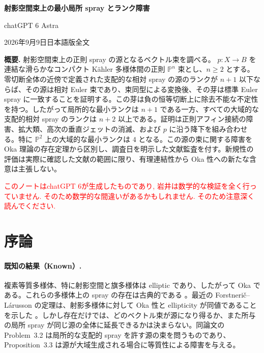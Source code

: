 \documentclass[12pt]{amsart}
\theoremstyle{definition}
\theoremstyle{remark}
\numberwithin{equation}{section}
\newcommand{\mP}{\mathbb{P}}
\newcommand{\xr}[1]{\textcolor{red}{#1}}
\begin{document}
\newpage
\setcounter{section}{0}
\setcounter{equation}{0}
\setcounter{thm}{0}
\renewcommand{\theHsection}{ja.\arabic{section}}
\renewcommand{\theHequation}{ja.\arabic{section}.\arabic{equation}}
\renewcommand{\theHthm}{ja.\arabic{section}.\arabic{thm}}
\renewcommand{\proofname}{証明}
\begin{center}
{\Large\bfseries 射影空間束上の最小局所 spray とランク障害\par}
\medskip
{\large chatGPT 6 Astra\par}
\medskip
2026年9月9日\quad 日本語版全文
\end{center}
\medskip
\noindent\textbf{概要.}
射影空間束上の正則 spray の源となるベクトル束を調べる。
$p:X\to B$ を連結な滑らかなコンパクト K\"ahler 多様体間の正則 $\mP^n$ 束とし、$n\geq2$ とする。
零切断全体の近傍で定義された支配的な相対 spray の源のランクが $n+1$ 以下ならば、その源は相対 Euler 束であり、束同型による変換後、その芽は標準 Euler spray に一致することを証明する。この芽は負の恒等切断上に除去不能な不定性を持つ。したがって局所的な最小ランクは $n+1$ である一方、すべての大域的な支配的相対 spray のランクは $n+2$ 以上である。証明は正則アフィン接続の障害、拡大類、高次の垂直ジェットの消滅、および $p$ に沿う降下を組み合わせる。特に $\mP^2$ 上の大域的な最小ランクは $4$ となる。この源の束に関する障害を Oka 理論の存在定理から区別し、調査日を明示した文献監査を付す。新規性の評価は実際に確認した文献の範囲に限り、有理連結性から Oka 性への新たな含意は主張しない。

\xr{このノートはchatGPT 6が生成したものであり, 岩井は数学的な検証を全く行っていません. そのため数学的な間違いがあるかもしれません. そのため注意深く読んでください.}

\section{序論}
\paragraph{既知の結果（Known）.}
複素等質多様体、特に射影空間と旗多様体は elliptic であり、したがって Oka である。これらの多様体上の spray の存在は古典的である \cite{ja:Gromov,ja:Book,ja:Recent}。最近の Forstneri\v c--L\'arusson の定理は、射影多様体に対して Oka 性と ellipticity が同値であることを示した \cite[Theorem~1.1]{ja:FLell}。しかし存在だけでは、どのベクトル束が源になり得るか、また所与の局所 spray が同じ源の全体に延長できるかは決まらない。同論文の Problem~3.2 は局所的な支配的 spray を許す源の束を問うものであり、Proposition~3.3 は源が大域生成される場合に等質性による障害を与える。
\end{document}
